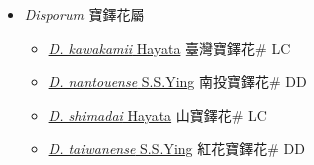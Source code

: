 
  \begin{itemize}
 \item[] \textit{Disporum} 寶鐸花屬
                    
  \begin{itemize}
        \item[] \href{http://www.theplantlist.org/tpl1.1/search?q=Disporum+kawakamii}{\textit{D. kawakamii} Hayata}   臺灣寶鐸花\# LC
        \item[] \href{http://www.theplantlist.org/tpl1.1/search?q=Disporum+nantouense}{\textit{D. nantouense} S.S.Ying}   南投寶鐸花\# DD
        \item[] \href{http://www.theplantlist.org/tpl1.1/search?q=Disporum+shimadai}{\textit{D. shimadai} Hayata}   山寶鐸花\# LC
        \item[] \href{http://www.theplantlist.org/tpl1.1/search?q=Disporum+taiwanense}{\textit{D. taiwanense} S.S.Ying}   紅花寶鐸花\# DD
  \end{itemize}
  \end{itemize}
